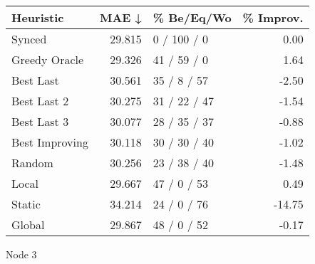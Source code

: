 \begin{tabular}{lrlr}
\toprule
\textbf{Heuristic} & \textbf{MAE ↓} & \textbf{\% Be/Eq/Wo} & \textbf{\% Improv.} \\
\midrule
            Synced &         29.815 &          0 / 100 / 0 &                0.00 \\
     Greedy Oracle &         29.326 &          41 / 59 / 0 &                1.64 \\
         Best Last &         30.561 &          35 / 8 / 57 &               -2.50 \\
       Best Last 2 &         30.275 &         31 / 22 / 47 &               -1.54 \\
       Best Last 3 &         30.077 &         28 / 35 / 37 &               -0.88 \\
    Best Improving &         30.118 &         30 / 30 / 40 &               -1.02 \\
            Random &         30.256 &         23 / 38 / 40 &               -1.48 \\
             Local &         29.667 &          47 / 0 / 53 &                0.49 \\
            Static &         34.214 &          24 / 0 / 76 &              -14.75 \\
            Global &         29.867 &          48 / 0 / 52 &               -0.17 \\
\bottomrule
\end{tabular}
\caption{Node 3}
\label{tab:non_lr05_le2_bs4_3}
